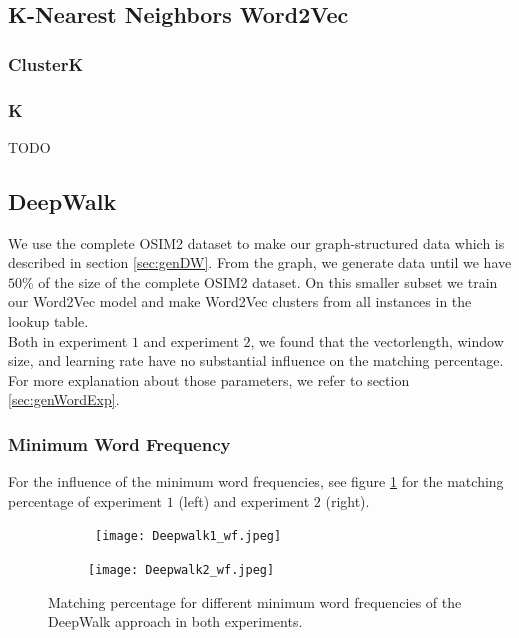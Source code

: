 \subsection{K-Nearest Neighbors Word2Vec}

\subsubsection{ClusterK}

\subsubsection{K}

TODO

\subsection{DeepWalk}

We use the complete OSIM2 dataset to make our graph-structured data which is described in section \ref{sec:genDW}. From the graph, we generate data until we have $50$\% of the size of the complete OSIM2 dataset. On this smaller subset we train our Word2Vec model and make Word2Vec clusters from all instances in the lookup table. \\
Both in experiment $1$ and experiment $2$, we found that the vectorlength, window size, and learning rate have no substantial influence on the matching percentage. For more explanation about those parameters, we refer to section \ref{sec:genWordExp}.

\subsubsection{Minimum Word Frequency}

For the influence of the minimum word frequencies, see figure \ref{fig:dw_wf} for the matching percentage of experiment $1$ (left) and experiment $2$ (right). \\

\begin{figure}[!htb]
	\centering
	\begin{subfigure}[b]{.49\textwidth}\
		\texttt{[image: Deepwalk1\_wf.jpeg]}
	\end{subfigure}
	\begin{subfigure}[b]{.49\textwidth}
		\texttt{[image: Deepwalk2\_wf.jpeg]}
	\end{subfigure}
	\caption{Matching percentage for different minimum word frequencies of the DeepWalk approach in both experiments.}
	\label{fig:dw_wf}
\end{figure}

